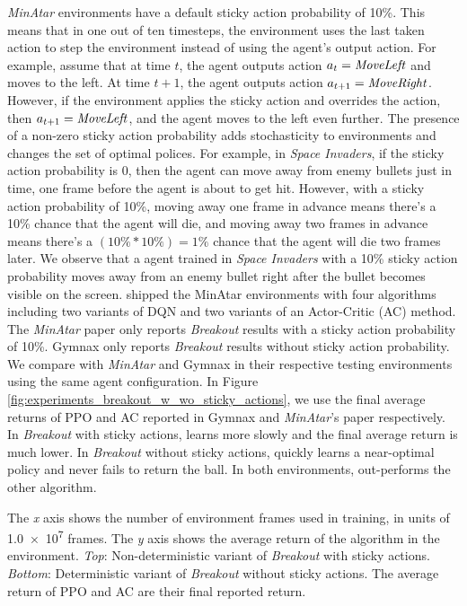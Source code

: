 \textit{MinAtar} environments have a default sticky action probability of 10\%.
This means that in one out of ten timesteps, the environment uses the last taken action to step the environment instead of using the agent's output action.
For example, assume that at time $t$, the agent outputs action $a_t = \text{\textit{MoveLeft}}$ and moves to the left.
At time $t+1$, the agent outputs action $a_{t+1} = \text{\textit{MoveRight}}$.
However, if the environment applies the sticky action and overrides the action, then $a_{t+1} = \text{\textit{MoveLeft}}$, and the agent moves to the left even further.
The presence of a non-zero sticky action probability adds stochasticity to environments and changes the set of optimal polices.
For example, in \textit{Space Invaders}, if the sticky action probability is 0, then the agent can move away from enemy bullets just in time, one frame before the agent is about to get hit.
However, with a sticky action probability of 10\%, moving away one frame in advance means there's a 10\% chance that the agent will die, and moving away two frames in advance means there's a $(10\% * 10\%) = 1\%$ chance that the agent will die two frames later.
We observe that a \moozi agent trained in \textit{Space Invaders} with a 10\% sticky action probability moves away from an enemy bullet right after the bullet becomes visible on the screen.
\citeauthor{MinAtarAtariInspiredTestbed_Young.Tian_2019} shipped the MinAtar environments with four algorithms including two variants of DQN and two variants of an Actor-Critic (AC) method.
The \textit{MinAtar} paper \cite{MinAtarAtariInspiredTestbed_Young.Tian_2019} only reports \textit{Breakout} results with a sticky action probability of 10\%.
Gymnax only reports \textit{Breakout} results without sticky action probability.
We compare with \textit{MinAtar} and Gymnax in their respective testing environments using the same \moozi agent configuration.
In Figure \ref{fig:experiments_breakout_w_wo_sticky_actions}, we use the final average returns of PPO and AC reported in Gymnax and \textit{MinAtar}'s paper respectively.
In \textit{Breakout} with sticky actions, \moozi learns more slowly and the final average return is much lower.
In \textit{Breakout} without sticky actions, \moozi quickly learns a near-optimal policy and never fails to return the ball.
In both environments, \moozi out-performs the other algorithm.

{
    The \textit{x} axis shows the number of environment frames used in training, in units of \num{1.0e7} frames.
    The \textit{y} axis shows the average return of the algorithm in the environment.
    \textit{Top}: Non-deterministic variant of \textit{Breakout} with sticky actions.
    \textit{Bottom}: Deterministic variant of \textit{Breakout} without sticky actions.
    The average return of PPO and AC are their final reported return.
}

